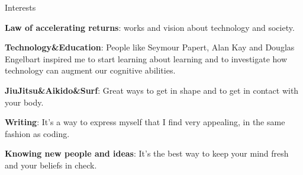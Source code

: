 \begin{rubric}{Interests}{
    \entry* \textbf{Law of accelerating returns}:  works and
    vision about technology and society. 

    \entry* \textbf{Technology\&Education}: People like 
    Seymour Papert, Alan Kay and Douglas Engelbart inspired me to
    start learning about learning and to investigate how technology can augment
    our cognitive abilities.

    \entry* \textbf{JiuJitsu\&Aikido\&Surf}: Great ways to get in shape and to get in
    contact with your body.

    \entry* \textbf{Writing}: It's a way to express myself that I find very
    appealing, in the same fashion as coding.

    \entry* \textbf{Knowing new people and ideas}: It's the best way to keep
    your mind fresh and your beliefs in check. 

}\end{rubric}

